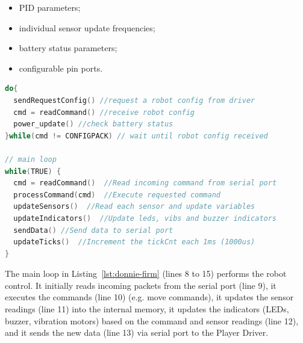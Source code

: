 \begin{itemize}
\item PID parameters;
\item individual sensor update frequencies;
\item battery status parameters;
\item configurable pin ports.
\end{itemize}


\begin{lstlisting}[language=C,frame=lines,xleftmargin=5.0ex, caption={Arduino-based firmaware.},label=lst:donnie-firm]  
do{
  sendRequestConfig() //request a robot config from driver
  cmd = readCommand() //receive robot config
  power_update() //check battery status
}while(cmd != CONFIGPACK) // wait until robot config received

// main loop
while(TRUE) {
  cmd = readCommand()  //Read incoming command from serial port
  processCommand(cmd)  //Execute requested command
  updateSensors()  //Read each sensor and update variables
  updateIndicators()  //Update leds, vibs and buzzer indicators
  sendData() //Send data to serial port
  updateTicks()  //Increment the tickCnt each 1ms (1000us)
}
\end{lstlisting}


The main loop in Listing~\ref{lst:donnie-firm} (lines 8 to 15) performs the robot control. It initially reads incoming packets from the serial port (line 9), it executes the commands (line 10) (e.g. move commands), it updates the sensor readings (line 11) into the internal memory, it updates the indicators (LEDs, buzzer, vibration motors) based on the command and sensor readings (line 12), and it sends the new data (line 13) via serial port to the Player Driver. 

%
%
%
%
%
%

